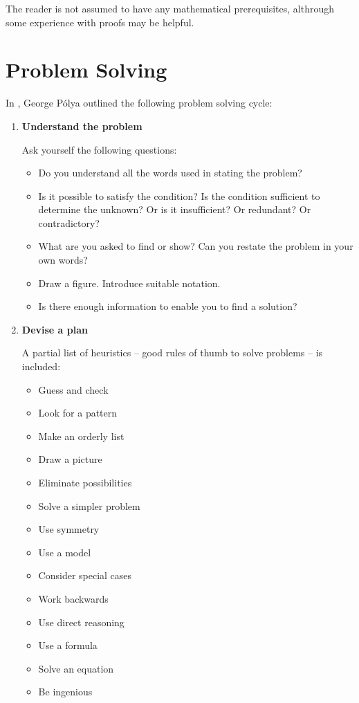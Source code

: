 \documentclass[12pt,a4 paper]{extreport}
\begin{document}
The reader is not assumed to have any mathematical prerequisites, althrough some experience with proofs may be helpful.

\section*{Problem Solving}
In \cite{polya}, George P\'{o}lya outlined the following problem solving cycle:
\begin{enumerate}
\item \textbf{Understand the problem}

Ask yourself the following questions:
\begin{itemize}
\item Do you understand all the words used in stating the problem?
\item Is it possible to satisfy the condition? Is the condition sufficient to determine the unknown? Or is it insufficient? Or redundant? Or contradictory?
\item What are you asked to find or show? Can you restate the problem in your own words?
\item Draw a figure. Introduce suitable notation.
\item Is there enough information to enable you to find a solution?
\end{itemize}

\item \textbf{Devise a plan}

A partial list of heuristics -- good rules of thumb to solve problems -- is included:
\begin{multicols}{2}
\begin{itemize}
\item Guess and check
\item Look for a pattern
\item Make an orderly list
\item Draw a picture
\item Eliminate possibilities
\item Solve a simpler problem
\item Use symmetry
\item Use a model
\item Consider special cases
\item Work backwards
\item Use direct reasoning
\item Use a formula
\item Solve an equation
\item Be ingenious
\end{itemize}
\end{multicols}


\end{enumerate}
\end{document}
